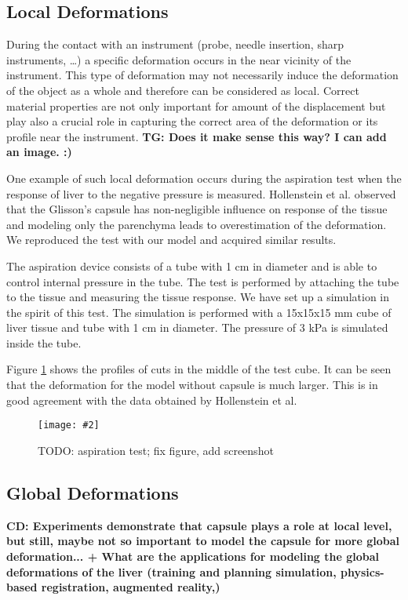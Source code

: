 \documentclass{llncs}
\newcommand{\TG}[1]{{\color{blue}\textbf{TG: #1}}}
\newcommand{\CD}[1]{{\color{green}\textbf{CD: #1}}}
\newcommand{\Figure}[3]{%
\begin{figure}[htb]
  \centering
  \texttt{[image: \#2]}
  \caption{\label{fig-#2}#3}
\end{figure}}
\begin{document}
\subsection{Local Deformations} %

During the contact with an instrument (probe, needle insertion, sharp
instruments, \ldots) a specific deformation occurs in the near vicinity of
the instrument. This type of deformation may not necessarily induce the
deformation of the object as a whole and therefore can be considered as
local. Correct material properties are not only important for amount of the
displacement but play also a crucial role in capturing the correct area of
the deformation or its profile near the instrument.
\TG{Does it make sense this way? I can add an image. :)}

One example of such local deformation occurs during the aspiration test
when the response of liver to the negative pressure is measured.
Hollenstein et al. \cite{Hollenstein2006} observed that the Glisson's
capsule has non-negligible influence on response of the tissue and modeling
only the parenchyma leads to overestimation of the deformation. We
reproduced the test with our model and acquired similar results.

The aspiration device consists of a tube with 1 cm in diameter and is able
to control internal pressure in the tube. The test is performed by
attaching the tube to the tissue and measuring the tissue response. We
have set up a simulation in the spirit of this test. 
The simulation is performed with a 15x15x15 mm cube of liver tissue and tube
with 1 cm in diameter. The pressure of 3 kPa is simulated inside the tube.

Figure \ref{fig-aspiration} shows the profiles of cuts in the middle of the
test cube. It can be seen that the
deformation for the model without capsule is much larger. This is in good
agreement with the data obtained by Hollenstein et al.

\Figure{4in}{aspiration}{TODO: aspiration test; fix figure, add screenshot}





\subsection{Global Deformations}
\CD{ Experiments demonstrate that capsule plays a role at local level, but still, maybe not so important to model the capsule for more global deformation...
+ What are the applications for modeling the global deformations of the liver (training and planning simulation, physics-based registration, augmented reality,)}
\end{document}
